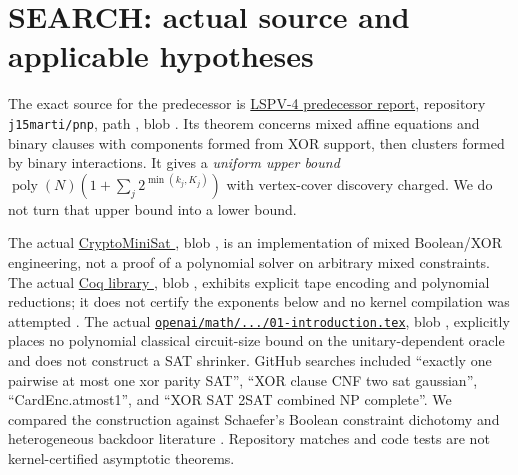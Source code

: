 \documentclass[11pt]{article}
\newcommand{\poly}{\operatorname{poly}}
\begin{document}
\section{SEARCH: actual source and applicable hypotheses}
The exact source for the predecessor is 
\href{https://github.com/j15marti/pnp/blob/main/research/agents/lspv-4/2026-10-29_0636_LSPV-4_ADAPTIVE_MIN_CLUSTER_PORTFOLIO223.tex}{LSPV-4 predecessor report}, repository \texttt{j15marti/pnp}, path , blob 
\texttt{}. Its theorem concerns mixed affine equations and binary clauses with components formed from XOR support, then clusters formed by binary interactions. It gives a \emph{uniform upper bound} $\poly(N)(1+\sum_j2^{\min(k_j,K_j)})$ with vertex-cover discovery charged. We do not turn that upper bound into a lower bound.

The actual \href{https://github.com/msoos/cryptominisat/blob/master/src/gaussian.cpp}{CryptoMiniSat }, blob \texttt{}, is an implementation of mixed Boolean/XOR engineering, not a proof of a polynomial solver on arbitrary mixed constraints. The actual \href{https://github.com/uds-psl/coq-library-complexity/blob/coq-8.16/theories/NP/TM/mTM_to_singleTapeTM.v}{Coq library }, blob \texttt{}, exhibits explicit tape encoding and polynomial reductions; it does not certify the exponents below and no kernel compilation was attempted \cite{gahekunze}. The actual \href{https://github.com/openai/math/blob/main/preprints/Polynomial-Time-Unitary-Synthesis-from-a-Boolean-Oracle-October-5-2026/build/sections/01-introduction.tex}{\texttt{openai/math/.../01-introduction.tex}}, blob \texttt{}, explicitly places no polynomial classical circuit-size bound on the unitary-dependent oracle and does not construct a SAT shrinker. GitHub searches included ``exactly one pairwise at most one xor parity SAT'', ``XOR clause CNF two sat gaussian'', ``CardEnc.atmost1'', and ``XOR SAT 2SAT combined NP complete''. We compared the construction against Schaefer's Boolean constraint dichotomy \cite{schaefer} and heterogeneous backdoor literature \cite{gaspers}. Repository matches and code tests are not kernel-certified asymptotic theorems.
\end{document}
